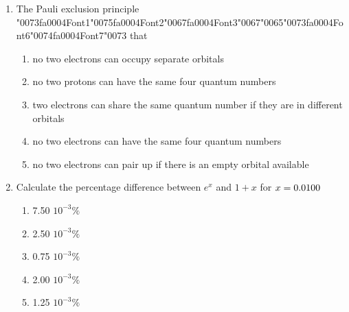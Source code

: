 \documentclass[12pt]{article}
\begin{document}
\begin{enumerate}[label=\arabic*.]
\begin{enumerate}[label=(\alph*)]
    \item SO2
    \item BeCl2
    \item SF6
    \item CBr4
    \item PCl4F
\end{enumerate}
\item The Pauli exclusion principle {\char"0073}{\csname fa0004Font1\endcsname\char"0075}{\csname fa0004Font2\endcsname\char"0067}{\csname fa0004Font3\endcsname\char"0067}{\char"0065}{\char"0073}{\csname fa0004Font6\endcsname\char"0074}{\csname fa0004Font7\endcsname\char"0073} that
\begin{enumerate}[label=(\alph*)]
    \item no two electrons can occupy separate orbitals
    \item no two protons can have the same four quantum numbers
    \item two electrons can share the same quantum number if they are in different orbitals
    \item no two electrons can have the same four quantum numbers
    \item no two electrons can pair up if there is an empty orbital available
\end{enumerate}
\item Calculate the percentage difference between $e^x$ and $1+x$ for $x={\char"0030}{\char"002E}{\char"0030}{\csname fa0005Font3\endcsname\char"0031}{\csname fa0005Font4\endcsname\char"0030}{\char"0030}$
\begin{enumerate}[label=(\alph*)]
    \item 7.50 $10^{-3} \%$
    \item 2.50 $10^{-3} \%$
    \item 0.75 $10^{-3} \%$
    \item 2.00 $10^{-3} \%$
    \item 1.25 $10^{-3} \%$
\end{enumerate}
\end{enumerate}
\end{document}
